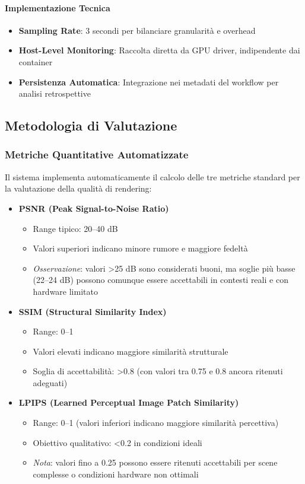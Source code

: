 \paragraph{Implementazione Tecnica}
\begin{itemize}
	\item \textbf{Sampling Rate}: 3 secondi per bilanciare granularità e overhead
	\item \textbf{Host-Level Monitoring}: Raccolta diretta da GPU driver, indipendente dai container
	\item \textbf{Persistenza Automatica}: Integrazione nei metadati del workflow per analisi retrospettive
\end{itemize}

\subsection{Metodologia di Valutazione}
\label{subsec:metodologia_valutazione}

\subsubsection{Metriche Quantitative Automatizzate}

Il sistema implementa automaticamente il calcolo delle tre metriche standard per la valutazione della qualità di rendering:

\begin{itemize} 
	\item \textbf{PSNR (Peak Signal-to-Noise Ratio)}
\begin{itemize}
	\item Range tipico: 20--40 dB
	\item Valori superiori indicano minore rumore e maggiore fedelt\`a
	\item \textit{Osservazione}: valori \textgreater 25 dB sono considerati buoni, ma soglie pi\`u basse (22--24 dB) possono comunque essere accettabili in contesti reali e con hardware limitato
\end{itemize}

\item \textbf{SSIM (Structural Similarity Index)}
\begin{itemize}
	\item Range: 0--1
	\item Valori elevati indicano maggiore similarit\`a strutturale
	\item Soglia di accettabilit\`a: \textgreater 0.8 (con valori tra 0.75 e 0.8 ancora ritenuti adeguati)
\end{itemize}

\item \textbf{LPIPS (Learned Perceptual Image Patch Similarity)}
\begin{itemize}
	\item Range: 0--1 (valori inferiori indicano maggiore similarit\`a percettiva)
	\item Obiettivo qualitativo: \textless 0.2 in condizioni ideali
	\item \textit{Nota}: valori fino a 0.25 possono essere ritenuti accettabili per scene complesse o condizioni hardware non ottimali
\end{itemize}
\end{itemize}
